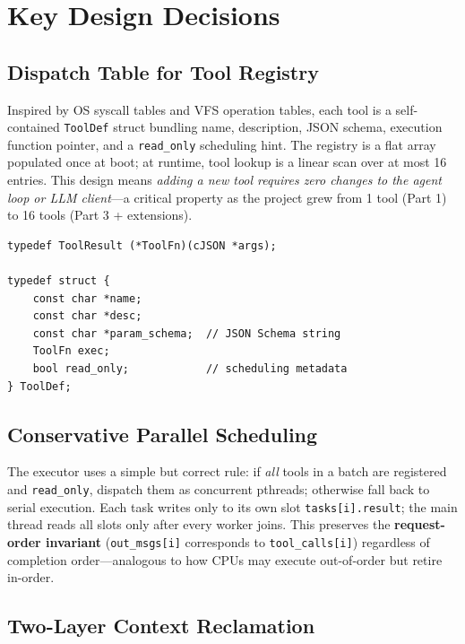 \documentclass[11pt,a4paper]{article}
\begin{document}
\section{Key Design Decisions}

\subsection{Dispatch Table for Tool Registry}

Inspired by OS syscall tables and VFS operation tables, each tool is a
self-contained \texttt{ToolDef} struct bundling name, description, JSON schema,
execution function pointer, and a \texttt{read\_only} scheduling hint. The
registry is a flat array populated once at boot; at runtime, tool lookup is a
linear scan over at most 16 entries. This design means \emph{adding a new tool
requires zero changes to the agent loop or LLM client}---a critical property
as the project grew from 1 tool (Part 1) to 16 tools (Part 3 + extensions).

\begin{lstlisting}[title={ToolDef interface (tools/tools.h)}]
typedef ToolResult (*ToolFn)(cJSON *args);

typedef struct {
    const char *name;
    const char *desc;
    const char *param_schema;  // JSON Schema string
    ToolFn exec;
    bool read_only;            // scheduling metadata
} ToolDef;
\end{lstlisting}

\subsection{Conservative Parallel Scheduling}

The executor uses a simple but correct rule: if \emph{all} tools in a batch are
registered and \texttt{read\_only}, dispatch them as concurrent pthreads;
otherwise fall back to serial execution. Each task writes only to its own slot
\texttt{tasks[i].result}; the main thread reads all slots only after every
worker joins. This preserves the \textbf{request-order invariant}
(\texttt{out\_msgs[i]} corresponds to \texttt{tool\_calls[i]}) regardless of
completion order---analogous to how CPUs may execute out-of-order but retire
in-order.

\subsection{Two-Layer Context Reclamation}
\end{document}
